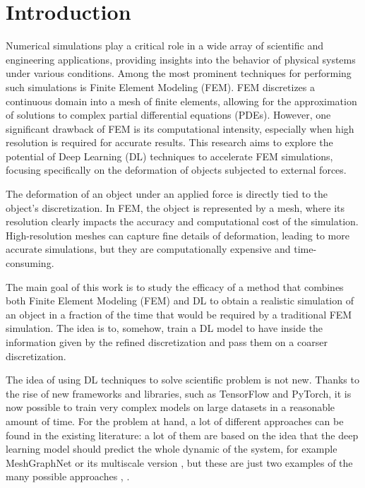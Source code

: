 \section{Introduction}

Numerical simulations play a critical role in a wide array of scientific and engineering applications, providing insights into the behavior of physical systems under various conditions. Among the most prominent techniques for performing such simulations is Finite Element Modeling (FEM). FEM discretizes a continuous domain into a mesh of finite elements, allowing for the approximation of solutions to complex partial differential equations (PDEs). However, one significant drawback of FEM is its computational intensity, especially when high resolution is required for accurate results. This research aims to explore the potential of Deep Learning (DL) techniques to accelerate FEM simulations, focusing specifically on the deformation of objects subjected to external forces.

The deformation of an object under an applied force is directly tied to the object's discretization. In FEM, the object is represented by a mesh, where its resolution clearly impacts the accuracy and computational cost of the simulation. High-resolution meshes can capture fine details of deformation, leading to more accurate simulations, but they are computationally expensive and time-consuming. 

The main goal of this work is to study the efficacy of a method that combines both Finite Element Modeling (FEM) and DL to obtain a realistic simulation of an object in a fraction of the time that would be required by a traditional FEM simulation. The idea is to, somehow, train a DL model to have inside the information given by the refined discretization and pass them on a coarser discretization.

The idea of using DL techniques to solve scientific problem is not new. Thanks to the rise of new frameworks and libraries, such as TensorFlow and PyTorch, it is now possible to train very complex models on large datasets in a reasonable amount of time. For the problem at hand, a lot of different approaches can be found in the existing literature: a lot of them are based on the idea that the deep learning model should predict the whole dynamic of the system, for example MeshGraphNet \cite{pfaffLearningMeshBasedSimulation2021a} or its multiscale version \cite{fortunatoMultiScaleMeshGraphNets2022}, but these are just two examples of the many possible approaches \cite{jiangMeshfreeFlowNetPhysicsConstrainedDeep2020}, \cite{hanPredictingPhysicsMeshreduced2022a}. 

